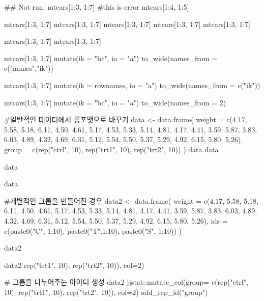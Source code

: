 \documentclass[a4paper]{book}
\begin{document}
\begin{Examples}
\begin{ExampleCode}


## Not run: 
mtcars[1:3, 1:7]
#this is error
mtcars[1:4, 1:5] %

mtcars[1:3, 1:7] %
mtcars[1:3, 1:7] %
mtcars[1:3, 1:7] %
mtcars[1:3, 1:7] %
mtcars[1:3, 1:7] %

mtcars[1:3, 1:7] %
mtcars[1:3, 1:7] %

mtcars[1:3, 1:7] %
  mutate(ik = "bc", io = "a")%
  to_wide(names_from = c("names","ik"))

mtcars[1:3, 1:7] %
  mutate(ik = rownames, io = "a")%
  to_wide(names_from = c("ik"))%

mtcars[1:3, 1:7] %
  mutate(ik = "bc", io = "a")%
  to_wide(names_from = 2)



#일반적인 데이터에서  롱포맷으로 바꾸기
data <- data.frame(
  weight = c(4.17, 5.58, 5.18, 6.11, 4.50, 4.61, 5.17, 4.53, 5.33, 5.14,
             4.81, 4.17, 4.41, 3.59, 5.87, 3.83, 6.03, 4.89, 4.32, 4.69,
             6.31, 5.12, 5.54, 5.50, 5.37, 5.29, 4.92, 6.15, 5.80, 5.26),
  group = c(rep("ctrl", 10), rep("trt1", 10), rep("trt2", 10))
)
data
data%

data%

data  %


#개별적인 그룹을 만들어진 경우
data2 <- data.frame(
  weight = c(4.17, 5.58, 5.18, 6.11, 4.50, 4.61, 5.17, 4.53, 5.33, 5.14,
             4.81, 4.17, 4.41, 3.59, 5.87, 3.83, 6.03, 4.89, 4.32, 4.69,
             6.31, 5.12, 5.54, 5.50, 5.37, 5.29, 4.92, 6.15, 5.80, 5.26),
  ids = c(paste0("C", 1:10), paste0("T",1:10), paste0("S", 1:10))
)

data2

data2 %
                 rep("trt1", 10), rep("trt2", 10)), col=2)

# 그룹을 나누어주는 아이디 생성
data2 %
jjstat::mutate_col(group= c(rep("ctrl", 10),
        rep("trt1", 10), rep("trt2", 10)), col=2)%
        add_rep_id("group")


\end{ExampleCode}
\end{Examples}
\end{document}

